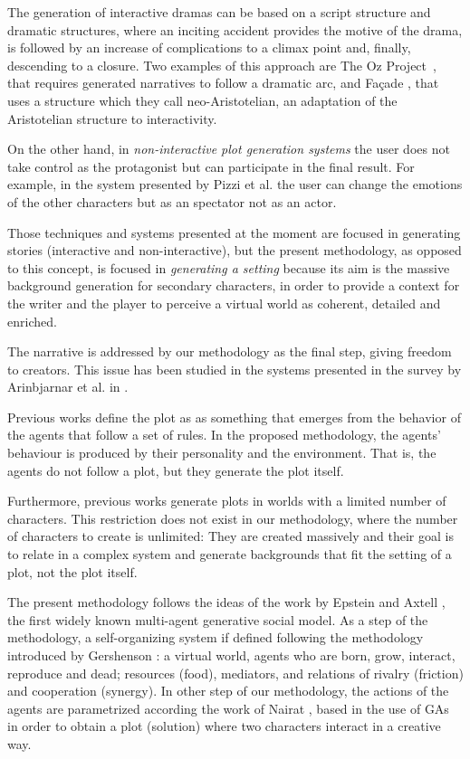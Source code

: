 \documentclass[letterpaper]{article}
\begin{document}
The generation of interactive dramas can be based on a script
structure \citep{ArchitectureYoung04} and dramatic structures, where an inciting accident provides the motive of the drama, is followed by an increase of complications to a climax point and, finally, descending to a closure. Two examples of this approach are The Oz Project~\citep{ozproject}, that requires generated narratives to follow a dramatic arc, and Fa\c{c}ade \citep{facade}, that uses a structure
which they call neo-Aristotelian, an adaptation of the Aristotelian
structure to interactivity.


On the other hand, in {\em non-interactive plot generation systems} the user
does not take control as the protagonist but can participate in the final result. For example, in the system
presented by Pizzi et al. \citep{pizzi2007interactive} the user can change the emotions of the other characters but as an spectator not as an actor.

Those techniques and systems presented at the moment are focused in generating stories (interactive and non-interactive), but the present methodology, as opposed to this concept, is focused in \textit{generating a setting}
because its aim is the massive background generation
for secondary characters, in order to provide a context for the writer and the
player to perceive a virtual world as coherent, detailed and
enriched.

The narrative is addressed by our methodology as the final step, giving freedom to creators. This issue has been studied in the systems presented in
the survey by Arinbjarnar et al. in \citep{ReviewArinbjarnar09}. 

Previous works define the plot as as something that emerges from the behavior of the agents that follow a set of rules. In the proposed methodology, the agents' behaviour is produced by their personality and the environment. That is, the agents do not follow a plot, but they generate the plot itself.

Furthermore,  previous works generate plots in worlds with a limited number of characters. This restriction does not exist in our methodology, where the number of characters to create is unlimited: They are created massively and their goal is to relate in a complex system and generate backgrounds that fit the setting of a plot, not the plot itself.

The present methodology follows the ideas of the work by Epstein and Axtell
\citep{epstein1996growing}, 
the first widely known multi-agent generative social model. As a step of the methodology, a self-organizing system if defined following the methodology introduced by Gershenson
\citep{gershenson2005general}: a virtual world, agents who are born, grow, 
interact, reproduce and dead; resources (food), mediators, and
relations of rivalry (friction) and cooperation (synergy). In other step of our methodology, the actions of the agents are parametrized according the work of Nairat
\citep{nairat2011character}, based in the use of GAs in order to
obtain a plot (solution) where two characters interact in a creative way.
\end{document}
